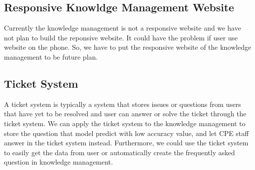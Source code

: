 \documentclass[12pt,oneside,openright,a4paper]{cpe-english-project}
\begin{document}
\subsection{Responsive Knowldge Management Website}
Currently the knowledge management is not a responsive website and we have not plan to build the reponsive website.
It could have the problem if user use website on the phone.
So, we have to put the responsive website of the knowledge management to be future plan.

\subsection{Ticket System}
A ticket system is typically a system that stores issues or questions from users that have yet to be resolved
and user can answer or solve the ticket through the ticket system.
We can apply the ticket system to the knowledge management to store the question that model predict
with low accuracy value, and let CPE staff answer in the ticket system instead.
Furthermore, we could use the ticket system to easily get the data from user or
automatically create the frequently asked question in knowledge management.


\nocite{*}



  \\
\end{document}
